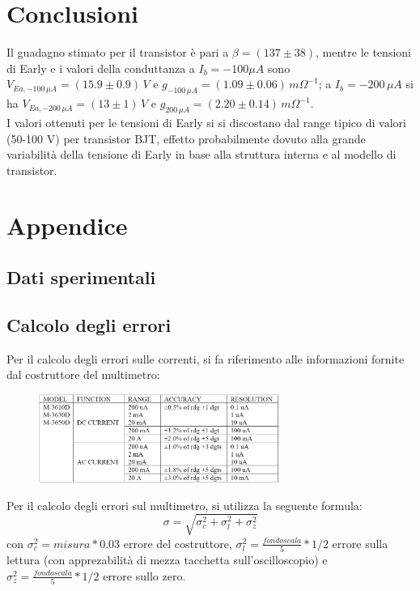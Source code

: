 \documentclass{article}
\begin{document}
\section{Conclusioni}
Il guadagno stimato per il transistor è pari a $\beta=(137\pm38)$, mentre le tensioni di Early e i valori della conduttanza a $I_b=-100 \mu A$ sono $V_{Ea,-100 \,\mu A}=(15.9\pm 0.9) \,V$ e ${g_{-100 \,\mu A}=(1.09 \pm 0.06) \,m\Omega^{-1}}$; a ${I_b=-200 \,\mu A}$ si ha $V_{Ea,-200 \,\mu A}=(13\pm 1) \,V $ e $g_{200 \, \mu A}=(2.20 \pm 0.14) \,m\Omega^{-1}$.\\
I valori ottenuti per le tensioni di Early si si discostano dal range tipico di valori (50-100 V) per transistor BJT, effetto probabilmente dovuto alla grande variabilità della tensione di Early in base alla struttura interna e al modello di transistor.
\newpage
\section{Appendice}

\subsection{Dati sperimentali}

\newpage
\subsection{Calcolo degli errori}
Per il calcolo degli errori sulle correnti, si fa riferimento alle informazioni fornite dal costruttore del multimetro:
\begin{figure}[H]
    \centering
    \includegraphics[width=0.7\textwidth]{Errore_multimetro.jpg}
\end{figure}
\noindent Per il calcolo degli errori sul multimetro, si utilizza la seguente formula:
\begin{equation}
    \sigma=\sqrt{\sigma_c^2+\sigma_l^2+\sigma_z^2}
\end{equation}
con $\sigma_c^2 = misura*0.03$ errore del costruttore, $\sigma_l^2= \frac{fondo scala}{5}*1/2$ errore sulla lettura (con apprezabilità di mezza tacchetta sull'oscilloscopio) e $\sigma_z^2= \frac{fondo scala}{5}*1/2$ errore sullo zero.
\end{document}
